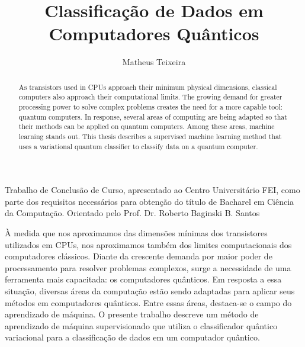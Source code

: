 \documentclass[rascunho,xindy,table]{fei}
\author{Matheus Teixeira}
\title{Classificação de Dados em Computadores Quânticos}
\begin{document}
\maketitle

\begin{folhaderosto}
Trabalho de Conclusão de Curso, apresentado ao Centro Universitário FEI, como parte dos requisitos necessários para obtenção do título de Bacharel em Ciência da Computação. Orientado pelo Prof. Dr. Roberto Baginski B. Santos
\end{folhaderosto}



\begin{resumo}
À medida que nos aproximamos das dimensões mínimas dos transistores utilizados em CPUs, nos aproximamos também dos limites computacionais dos computadores clássicos. Diante da crescente demanda por maior poder de processamento para resolver problemas complexos, surge a necessidade de uma ferramenta mais capacitada: os computadores quânticos. Em resposta a essa situação, diversas áreas da computação estão sendo adaptadas para aplicar seus métodos em computadores quânticos. Entre essas áreas, destaca-se o campo do aprendizado de máquina. O presente trabalho descreve um método de aprendizado de máquina supervisionado que utiliza o classificador quântico variacional para a classificação de dados em um computador quântico.


\end{resumo}

\begin{abstract}
As transistors used in CPUs approach their minimum physical dimensions, classical computers also approach their computational limits. The growing demand for greater processing power to solve complex problems creates the need for a more capable tool: quantum computers. In response, several areas of computing are being adapted so that their methods can be applied on quantum computers. Among these areas, machine learning stands out. This thesis describes a supervised machine learning method that uses a variational quantum classifier to classify data on a quantum computer.

\end{abstract}
\end{document}
